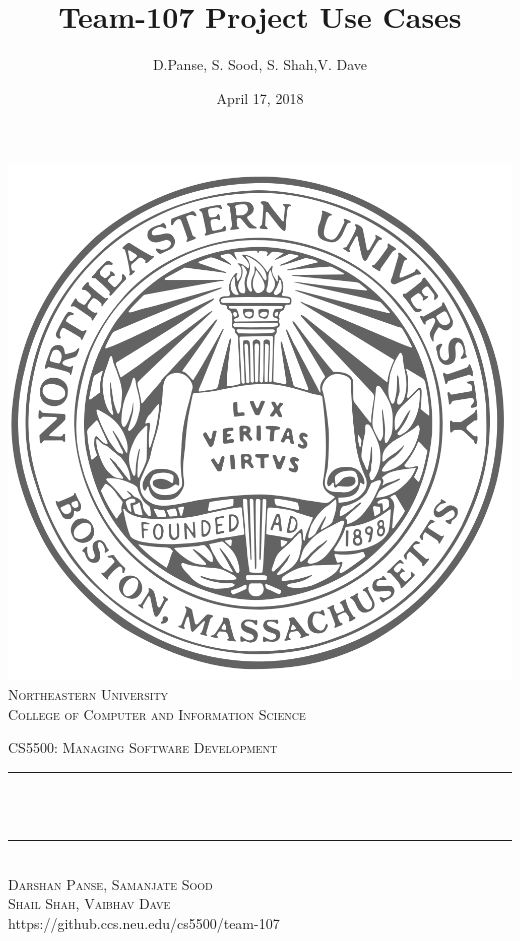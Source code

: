 \documentclass[12pt]{article}
\title{Team-107 Project Use Cases}
\author{D.Panse, S. Sood, S. Shah,V. Dave}
\date{April 17, 2018}
\makeatletter
\let\thetitle\@title
\let\thedate\@date
\def\thecourse{CS5500: Managing Software Development}
\def\theuniversity{Northeastern University}
\def\thecollege{College of Computer and Information Science}
\def\thegithuburl{https://github.ccs.neu.edu/cs5500/team-107}
\makeatother
\begin{document}

\begin{titlepage}
	\centering
    \includegraphics[scale = 0.20]{seal.png}\\[0.2cm]	
    \textsc{\LARGE \color{huskyred} \theuniversity\\[0.5mm]}	
	\textsc{\small \thecollege \\[1.5 cm]}	
    
    \textsc{\Large \thecourse }\\[0.5 cm]
    
	\rule{\linewidth}{0.2 mm} \\[0.4 cm]
	{ \huge \bfseries \thetitle}\\
	\rule{\linewidth}{0.2 mm} \\[1.5 cm]
	
	\textsc{\LARGE Darshan Panse, Samanjate Sood}\\[0.5 mm]
    \textsc{\LARGE Shail Shah, Vaibhav Dave}\\[0.5 mm]
    \thegithuburl\\[1.5 cm]
    \textsc{\LARGE \thedate}\\[2.0 cm]  
    
\end{titlepage}
\end{document}
